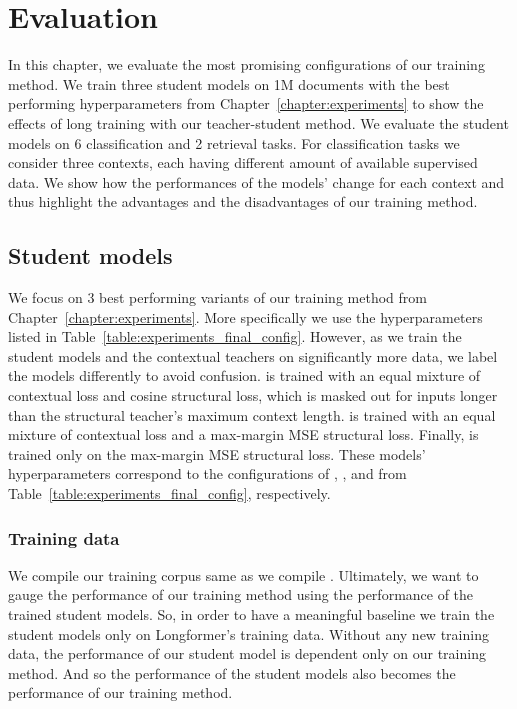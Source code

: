 \chapter{Evaluation}\label{chapter:evaluation}

In this chapter, we evaluate the most promising configurations of our training
method. We train three student models on 1M documents with the best performing
hyperparameters from Chapter~\ref{chapter:experiments} to show the effects of
long training with our teacher-student method. We evaluate the student models
on 6 classification and 2 retrieval tasks. For classification tasks we consider
three contexts, each having different amount of available supervised data. We
show how the performances of the models' change for each context and thus
highlight the advantages and the disadvantages of our training method.

\section{Student models}

We focus on 3 best performing variants of our training method from
Chapter~\ref{chapter:experiments}. More specifically we use the hyperparameters
listed in Table~\ref{table:experiments_final_config}. However, as we train the
student models and the contextual teachers on significantly more data, we label
the models differently to avoid confusion. {\CosineStudent} is trained with an
equal mixture of contextual loss and cosine structural loss, which is masked
out for inputs longer than the structural teacher's maximum context length.
{\MSEStudent} is trained with an equal mixture of contextual loss and a
max-margin MSE structural loss. Finally, {\OnlyMSEStudent} is trained only on
the max-margin MSE structural loss. These models' hyperparameters correspond to
the configurations of ,
, and  from
Table~\ref{table:experiments_final_config}, respectively.

\subsection{Training data}

We compile our training corpus same as we compile .
Ultimately, we want to gauge the performance of our training method using the
performance of the trained student models. So, in order to have a meaningful
baseline we train the student models only on Longformer's training data.
Without any new training data, the performance of our student model is
dependent only on our training method. And so the performance of the student
models also becomes the performance of our training method.

